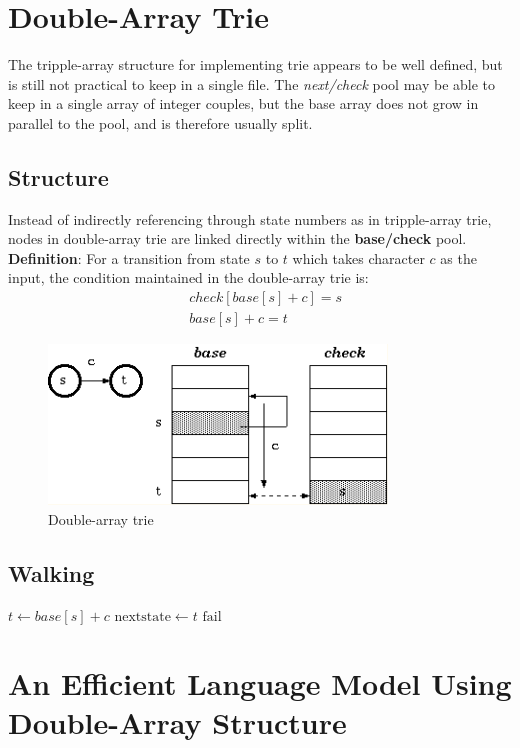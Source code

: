 \documentclass[a3paper, 12pt]{book} %
\begin{document}
\section{Double-Array Trie}
The tripple-array structure for implementing trie appears to be well defined, but is still not practical to keep in a single file. The \emph{next/check} pool may be able to keep in a single array of integer couples, but the base array does not grow in parallel to the pool, and is therefore usually split.

\subsection{Structure}
Instead of indirectly referencing through state numbers as in tripple-array trie, nodes in double-array trie are linked directly within the \textbf{base/check} pool.
\textbf{Definition}: For a transition from state $s$ to $t$ which takes character $c$ as the input, the condition maintained in the double-array trie is:\\
\begin{equation}
\begin{split}
& check[base[s]+c]=s \\
& base[s]+c=t
\end{split}
\end{equation}
\begin{figure}[htpb]
	\centering
	\includegraphics[width=9cm]{figures/double_array_trie.png}
	\caption{Double-array trie}
	\label{fig:boat1}
\end{figure}

\subsection{Walking}
\begin{algorithmic}
	\STATE $t\gets base[s] + c$
	\STATE $\mathrm{next state}\gets t$
	\ELSE
	\STATE $\mathrm{fail}$
	\ENDIF 
\end{algorithmic}


\section{An Efficient Language Model Using Double-Array Structure}
\end{document}
